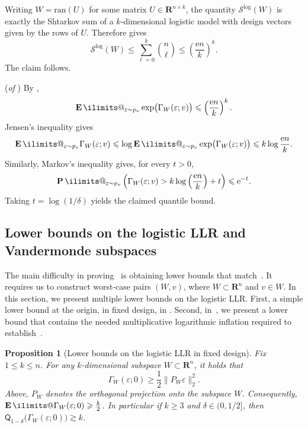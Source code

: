 \documentclass[11pt, letterpaper, hidelinks]{article}
\makeatletter
\renewcommand{\proofname}{\textit{\textbf{Proof}}}
\renewenvironment{proof}[1][\proofname]{\par\pushQED{\qed}\normalfont \topsep6\p@\@plus6\p@\relax\trivlist\item[\hskip\labelsep#1\@addpunct{}]\ignorespaces}{\popQED\endtrivlist\@endpefalse}
\newcommand{\R}{\mathbf R}
\newcommand{\e}{\mathrm{e}}
\newcommand{\1}{\mathbf 1}
\newcommand{\half}{\frac12}
\newcommand{\eps}{\varepsilon}
\renewcommand{\le}{\leqslant}
\renewcommand{\leq}{\leqslant}
\renewcommand{\geq}{\geqslant}
\newcommand{\E}{\operatorname*{\mathbf{E}}\ilimits@}
\renewcommand{\P}{\operatorname*{\mathbf{P}}\ilimits@}
\theoremstyle{plain}
\newtheorem{proposition}{Proposition}[section]
\theoremstyle{definition}
\newcommand{\Quant}[1]{\mathsf{Q}_{#1}}
\newcommand{\ran}{\mathrm{ran}}
\makeatother
\begin{document}
\begin{proof}
 Writing \(W=\ran(U)\) for some matrix
\(U\in\R^{n\times k}\), the quantity \(\mathcal S^{\operatorname{log}}(W)\) is
exactly the Shtarkov sum of a \(k\)-dimensional logistic model with design
vectors given by the rows of \(U\). Therefore 
gives
\[
\mathcal S^{\operatorname{log}}(W)
\le
\sum_{\ell=0}^k \binom{n}{\ell}
\le
\left(\frac{\e n}{k}\right)^k .
\]
The claim follows.
\end{proof}

\begin{proof}(\emph{of })
By ,
\[
\E_{\eps\sim p_v}\exp\bigl(\Gamma_W(\eps;v)\bigr)
\le
\left(\frac{\e n}{k}\right)^k.
\]
Jensen's inequality gives
\[
\E_{\eps\sim p_v}\Gamma_W(\eps;v)
\le
\log\E_{\eps\sim p_v}\exp\bigl(\Gamma_W(\eps;v)\bigr)
\le
k\log\frac{\e n}{k}.
\]
Similarly, Markov's inequality gives, for every \(t>0\),
\[
\P_{\eps\sim p_v}\left( \Gamma_W(\eps;v)>k\log\Big(\frac{\e n}{k}\Big)+t\right)
\leq \e^{-t}.
\]
Taking \(t=\log(1/\delta)\) yields the claimed quantile bound.
\end{proof}



\subsection{Lower bounds on the logistic LLR and Vandermonde subspaces}

The main difficulty in proving~ is obtaining lower bounds that match~. It requires us to construct worst-case pairs $(W,v)$, where $W \subset \R^n$ and $v \in W$. In this section, we present multiple lower bounds on the logistic LLR. First, a simple lower bound at the origin, in fixed design, in .
Second, in~, we present a lower bound that contains the needed multiplicative logarithmic inflation required to establish~.




\begin{proposition}[Lower bounds on the logistic LLR in fixed design]
\label{prop:fixed-design-lower}
Fix $1\leq k \leq n$. 
For any $k$-dimensional subspace $W \subset \R^n$, it holds that 
\[
\Gamma_W(\eps; 0) \geq \half \|P_W \eps\|_2^2.
\]
Above, $P_W$ denotes the orthogonal projection onto the subspace $W$. Consequently, $ \E \Gamma_W(\eps; 0) \geq \frac{k}{2}$. In particular if $k \geq 3$ and $\delta \in (0, 1/2]$, then 
$\Quant{1-\delta} \big(\Gamma_W(\eps; 0)\big) \gtrsim k$. 
\end{proposition}
\end{document}
